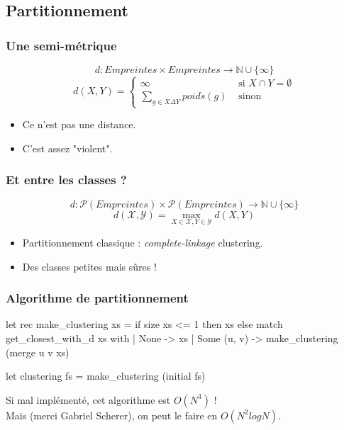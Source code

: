 \documentclass[11pt]{beamer}
\newenvironment{ocaml}
{\small\VerbatimEnvironment
	\begin{myocaml}}
	{\end{myocaml}}
\begin{document}
\subsection{Partitionnement}

\begin{frame}
	\frametitle{Une semi-métrique}
	\begin{definition}[Dissimilarité]
		$$
		d : Empreintes \times Empreintes \to \mathbb{N} \cup \{ \infty \}
		$$
		\begin{equation*}
		d (X,Y) = \begin{cases} 
		\infty & \text{ si $X \cap Y = \emptyset$} \\
		\sum\limits_{g \in X \Delta Y} poids(g) & \text{ sinon }
		\end{cases}
		\end{equation*}
	\end{definition}
	
	\begin{itemize}
		\item Ce n'est pas une distance.
		\item C'est assez "violent".
	\end{itemize}
\end{frame}

\begin{frame}
	\frametitle{Et entre les classes ?}
	\begin{definition}
		$$
		d : \mathcal{P}(Empreintes) \times \mathcal{P}(Empreintes) \to \mathbb{N} \cup \{ \infty \}
		$$
		$$
		d (\mathcal{X},\mathcal{Y}) = \max\limits_{X \in \mathcal{X},Y \in \mathcal{Y}} d(X,Y) $$
	\end{definition}
	\begin{itemize}
		\item Partitionnement classique : \emph{complete-linkage} clustering.
		\item Des classes petites mais sûres !
	\end{itemize}
\end{frame}

\begin{frame}[fragile]
	\frametitle{Algorithme de partitionnement}
	
\begin{ocaml}
let rec make_clustering xs =
  if size xs <= 1 
  then xs 
  else
    match get_closest_with_d xs with
    | None -> xs
    | Some (u, v) -> make_clustering (merge u v xs)

let clustering fs = 
  make_clustering (initial fs)
\end{ocaml}
	
\pause 
	
Si mal implémenté, cet algorithme est $O(N^3)$ !\\
Mais (merci Gabriel Scherer), on peut le faire en $O(N^2 log N)$.
\end{frame}
\end{document}
